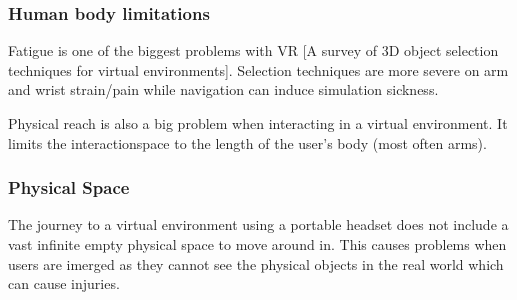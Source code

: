 \subsubsection{Human body limitations}
Fatigue is one of the biggest problems with VR [A survey of 3D object selection techniques for virtual environments].
Selection techniques are more severe on arm and wrist strain/pain while navigation can induce simulation sickness.

Physical reach is also a big problem when interacting in a virtual environment. It limits the interactionspace to the length of the user's body (most often arms).

\subsubsection{Physical Space}
The journey to a virtual environment using a portable headset does not include a vast infinite empty physical space to move around in. This causes problems when users are imerged as they cannot see the physical objects in the real world which can cause injuries. 
